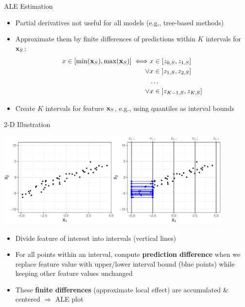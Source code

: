 \documentclass[11pt,compress,t,notes=noshow, aspectratio=169, xcolor=table]{beamer}
\begin{document}

\begin{frame}{ALE Estimation}

\begin{itemize}
  \item Partial derivatives not useful for all models (e.g., tree-based methods)
  \item Approximate them by finite differences of predictions within $K$ intervals for $\xv_S$:
  $$
  \begin{aligned}
  x \in [\min(\xv_S), \max(\xv_S)] \iff &x \in [z_{0, S}, z_{1, S}] \\
  \lor &x \in \; ]z_{1, S}, z_{2, S}] \\
  &\dots \\
  \lor &x \in \; ]z_{K-1, S}, z_{K, S}]
  \end{aligned}
  $$
  \item Create $K$ intervals for feature $\xv_S$, e.g., using quantiles as interval bounds 
\end{itemize}

\end{frame}


\begin{frame}{2-D Illustration}

\centerline{\includegraphics[width=0.9\textwidth]{figure/ale_interval}}

\begin{itemize}
\item Divide feature of interest into intervals (vertical lines)
\item For all points within an interval, compute \textbf{prediction difference} when we replace feature value with upper/lower interval bound (blue points) while keeping other feature values unchanged
\item These \textbf{finite differences} (approximate local effect) are accumulated \& centered $\Rightarrow$ ALE plot %
\end{itemize}

\end{frame}
\end{document}
